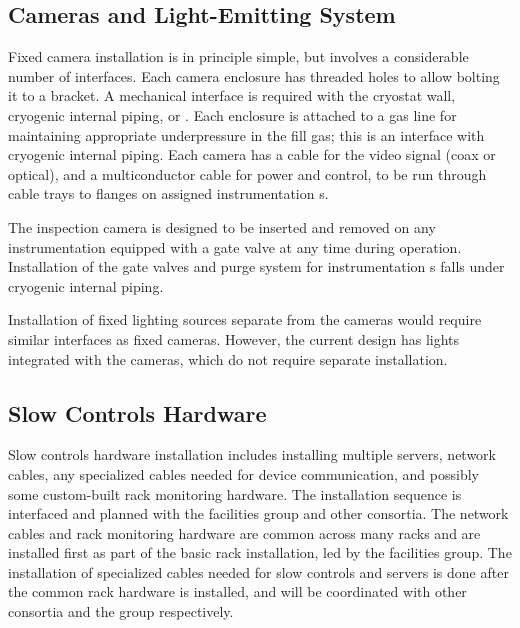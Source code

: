 \subsection{Cameras and Light-Emitting System}
\label{sec:fdgen-slow-cryo-install-c}

Fixed camera installation is in principle simple, but involves a
considerable number of interfaces. Each camera enclosure has 
threaded holes to allow bolting it to a bracket. A mechanical
interface is required with the cryostat wall, cryogenic internal
piping, or . Each enclosure is attached
to a gas line for maintaining appropriate underpressure in the fill
gas; this is an interface with cryogenic internal piping. Each camera has a
cable for the video signal (coax or optical), and a multiconductor
cable for power and control, to be run through cable trays to flanges
on assigned instrumentation \fdth{}s.

The inspection camera is designed to be inserted and removed on any
instrumentation \fdth equipped with a gate valve at any time
during operation.  Installation of the gate valves and purge system
for instrumentation \fdth{}s falls under cryogenic internal
piping.

Installation of fixed lighting sources separate from the cameras would
require similar interfaces as fixed cameras.  However, the current
design has lights integrated with the cameras, which do not require separate
installation.



\subsection{Slow Controls Hardware}
\label{sec:fdgen-slow-cryo-install-sc-hard}

Slow controls hardware installation includes installing multiple
servers, network cables, any specialized cables needed
for device communication, and possibly some custom-built rack
monitoring hardware. The installation sequence is interfaced and
planned with the facilities group and other consortia. The network
cables and rack monitoring hardware are common across many racks
and are installed first as part of the basic rack installation, 
led by the facilities group. The installation of
specialized cables needed for slow controls and servers is done
after the common rack hardware is installed, and will be coordinated
with other consortia and the  group respectively.

